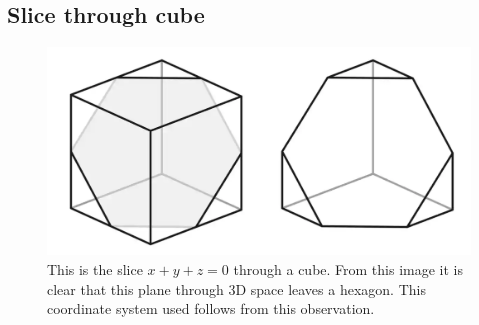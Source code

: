 \subsection{Slice through cube}
\label{fig:hexagona_slice_through_cube}
\begin{figure}[H]
    \centering
    \includegraphics[scale = 0.3]{images/hexagonal_slice_through_cube.png}
    \caption{This is the slice  $x + y + z = 0$ through a cube. From this image it is clear that this plane through 3D space leaves a hexagon. This coordinate system used follows from this observation.}

\end{figure}




